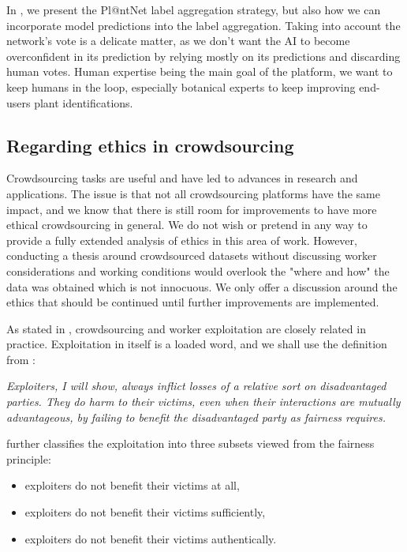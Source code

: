 In , we present the Pl@ntNet label aggregation strategy, but also how we can incorporate model predictions into the label aggregation.
Taking into account the network's vote is a delicate matter, as we don't want the AI to become overconfident in its prediction by relying mostly on its predictions and discarding human votes.
Human expertise being the main goal of the platform, we want to keep humans in the loop, especially botanical experts to keep improving end-users plant identifications.

\subsection{Regarding ethics in crowdsourcing}
\label{sub:ethics}

Crowdsourcing tasks are useful and have led to advances in research and applications.
The issue is that not all crowdsourcing platforms have the same impact, and we know that there is still room for improvements to have more ethical crowdsourcing in general.
We do not wish or pretend in any way to provide a fully extended analysis of ethics in this area of work.
However, conducting a thesis around crowdsourced datasets without discussing worker considerations and working conditions would overlook the "where and how" the data was obtained which is not innocuous.
We only offer a discussion around the ethics that should be continued until further improvements are implemented.

As stated in \citet{schmidt2013good}, crowdsourcing and worker exploitation are closely related in practice.
Exploitation in itself is a loaded word, and we shall use the definition from \citet{mayerexploitation}:
\begin{center}
    \begin{minipage}{.75\textwidth}
    \emph{
    Exploiters, I will show, always inflict losses of a relative sort on disadvantaged parties. They do harm to their victims, even when their interactions are mutually advantageous, by failing to benefit the disadvantaged party as fairness requires.
    }
    \end{minipage}
\end{center}
\citet{mayerexploitation} further classifies the exploitation into three subsets viewed from the fairness principle:
\begin{itemize}
    \item exploiters do not benefit their victims at all,
    \item exploiters do not benefit their victims sufficiently,
    \item exploiters do not benefit their victims authentically.
\end{itemize}

